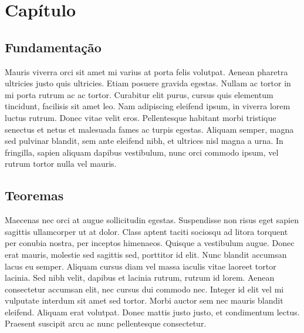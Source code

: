 
\chapter{Capítulo}


\section{Fundamentação }

Mauris viverra orci sit amet \citep{article:dummy} mi varius at porta
felis volutpat. Aenean pharetra ultricies justo quis ultricies. Etiam
posuere gravida egestas. Nullam ac tortor in mi porta rutrum ac ac
tortor. Curabitur elit purus, cursus quis elementum tincidunt, facilisis
sit amet leo. Nam adipiscing eleifend ipsum, in viverra lorem luctus
rutrum. Donec vitae velit eros. Pellentesque habitant morbi tristique
senectus et netus et malesuada fames ac turpis egestas. Aliquam semper,
magna sed pulvinar blandit, sem ante eleifend nibh, et ultrices nisl
magna a urna. In fringilla, sapien aliquam dapibus vestibulum, nunc
orci commodo ipsum, vel rutrum tortor nulla vel mauris.

\section{Teoremas}

Maecenas nec orci at augue sollicitudin egestas. Suspendisse non risus
eget sapien sagittis ullamcorper ut at dolor. Class aptent taciti
sociosqu ad litora torquent per conubia nostra, per inceptos himenaeos.
Quisque a vestibulum augue. Donec erat mauris, molestie sed sagittis
sed, porttitor id elit. Nunc blandit accumsan lacus eu semper. Aliquam
cursus diam vel massa iaculis vitae laoreet tortor lacinia. Sed nibh
velit, dapibus et lacinia rutrum, rutrum id lorem. Aenean consectetur
accumsan elit, nec cursus dui commodo nec. Integer id elit vel mi
vulputate interdum sit amet sed tortor. Morbi auctor sem nec mauris
blandit eleifend. Aliquam erat volutpat. Donec mattis justo justo,
et condimentum lectus. Praesent suscipit arcu ac nunc pellentesque
consectetur.


